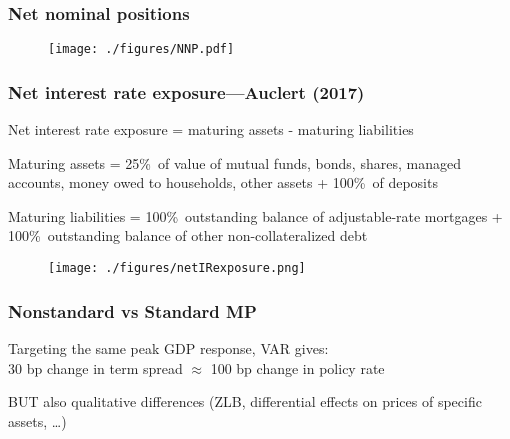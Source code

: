 \documentclass[pdflatex,aspectratio=169]{beamer}
\newcommand{\jemph}[1]{{\color{StataDarkBlue}#1}}
\begin{document}
\begin{frame}\frametitle{\bf Net nominal positions}

\begin{figure}
\begin{center}
\texttt{[image: ./figures/NNP.pdf]}
\end{center}
\end{figure}

\end{frame}



\begin{frame}\frametitle{\bf Net interest rate exposure---Auclert (2017)}

\footnotesize
\bi
\item Net interest rate exposure = maturing assets - maturing liabilities
\item Maturing assets = 25\%\ of value of mutual funds, bonds, shares, managed accounts, money owed to households, other assets + 100\%\ of deposits
\item Maturing liabilities = 100\%\ outstanding balance of adjustable-rate mortgages + 100\%\ outstanding balance of other non-collateralized debt
\ei
\begin{figure}
\begin{center}
\texttt{[image: ./figures/netIRexposure.png]}
\end{center}
\end{figure}
\end{frame}



\begin{frame}\frametitle{\bf Nonstandard vs Standard MP}


\bi
\item Targeting the same peak GDP response, VAR gives:\\ \jemph{30 bp change in term spread ${}\approx{}$ 100 bp change in policy rate}
\item BUT also qualitative differences (ZLB, differential effects on prices of specific assets, \dots)
\ei

\end{frame}






\end{document}
